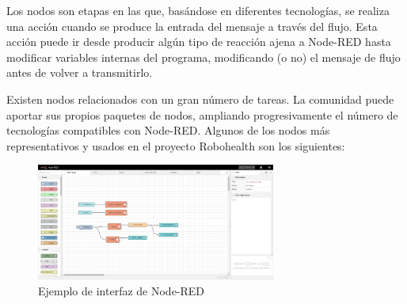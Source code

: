 Los nodos son etapas en las que, basándose en diferentes tecnologías, se realiza una acción cuando se produce la entrada del mensaje a través del flujo. Esta acción puede ir desde producir algún tipo de reacción ajena a Node-RED hasta modificar variables internas del programa, modificando (o no) el mensaje de flujo antes de volver a transmitirlo.

Existen nodos relacionados con un gran número de tareas. La comunidad puede aportar sus propios paquetes de nodos, ampliando progresivamente el número de tecnologías compatibles con Node-RED. Algunos de los nodos más representativos y usados en el proyecto Robohealth son los siguientes:

\begin{figure}[H]
\centering
\includegraphics[width=0.7\textwidth]{figuras/InterfazNodeRed.png}
\caption{Ejemplo de interfaz de Node-RED}
\label{fig:nodeinterfaz}
\end{figure}

